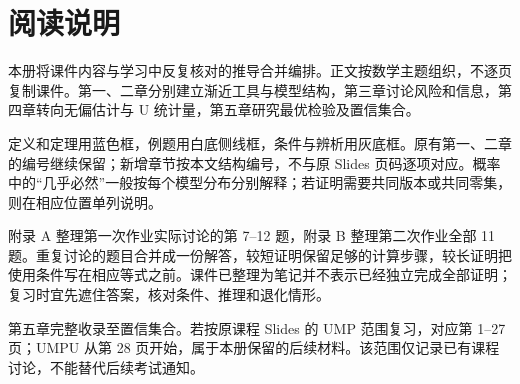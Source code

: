 
\newcommand{\NoteSubtitle}{第一至五章与习题解答}


\chapter*{阅读说明}
本册将课件内容与学习中反复核对的推导合并编排。正文按数学主题组织，不逐页复制课件。第一、二章分别建立渐近工具与模型结构，第三章讨论风险和信息，第四章转向无偏估计与 U 统计量，第五章研究最优检验及置信集合。

定义和定理用蓝色框，例题用白底侧线框，条件与辨析用灰底框。原有第一、二章的编号继续保留；新增章节按本文结构编号，不与原 Slides 页码逐项对应。概率中的“几乎必然”一般按每个模型分布分别解释；若证明需要共同版本或共同零集，则在相应位置单列说明。

附录 A 整理第一次作业实际讨论的第 7--12 题，附录 B 整理第二次作业全部 11 题。重复讨论的题目合并成一份解答，较短证明保留足够的计算步骤，较长证明把使用条件写在相应等式之前。课件已整理为笔记并不表示已经独立完成全部证明；复习时宜先遮住答案，核对条件、推理和退化情形。

第五章完整收录至置信集合。若按原课程 Slides 的 UMP 范围复习，对应第 1--27 页；UMPU 从第 28 页开始，属于本册保留的后续材料。该范围仅记录已有课程讨论，不能替代后续考试通知。






\appendix
\renewcommand{\chaptermark}[1]{\markboth{附录 \thechapter}{}}



